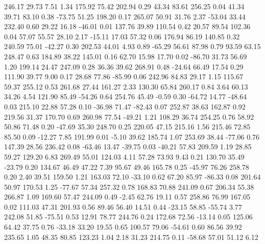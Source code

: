   246.17   29.73    7.51    1.34
  175.92   75.42  202.94    0.29
   43.34   83.61  256.25    0.04
   41.34   39.71   83.10    0.38
  -73.75   51.25  198.20    0.17
  265.07   50.91   31.76    2.37
  -53.04   33.44  232.40    0.60
   29.22   16.18  -46.01    0.01
  137.76   39.89  110.54    0.42
   20.57   89.54  102.36    0.04
   57.07   55.57   28.10    2.17
  -15.11   17.03   57.32    0.06
  176.94   86.19  140.85    0.32
  240.59   75.01  -42.27    0.30
  202.53   44.01    4.93    0.89
  -65.29   56.61   87.98    0.79
   93.59   63.15  248.47    0.63
  184.89   38.22  145.01    0.16
   62.70   15.98   17.70    0.02
  -86.70   31.73   56.69    1.20
  199.14   24.47  247.09    0.28
   36.36   39.62  268.91    0.48
  -24.64   66.49   17.54    0.29
  111.90   39.77    9.00    0.17
   28.68   77.86  -85.99    0.06
  242.96   84.83   29.17    1.15
  115.67   59.37  255.12    0.53
  261.68   27.44  161.27    2.33
  130.30   65.84  260.17    0.84
    3.64   60.13   34.26    4.54
  121.90   85.49  -54.26    0.64
  254.76   45.49   -0.59    0.30
  -64.72   14.77  -48.64    0.03
  215.10   22.88   57.28    0.10
  -36.98   71.47  -82.43    0.07
  252.87   38.63  162.87    0.92
  219.56   31.37  170.70    0.69
  260.98   77.54  -49.21    1.21
  108.29   36.74  254.25    0.76
   58.92   50.86   71.48    0.20
  -47.69   35.30  248.70    0.25
  220.05   47.15  215.16    1.56
  215.46   72.85   85.50    0.09
  -12.27    7.85  191.99    0.01
   -5.10   39.62  185.74    1.07
  253.69   38.44  -77.06    0.76
  147.39   28.56  236.42    0.08
  -63.46   13.47  -39.75    0.03
  -40.21   57.83  209.59    1.19
   28.85   59.27  129.20    6.83
  269.49   55.01  124.03    4.11
   57.28   73.93    9.43    0.21
  130.70   35.49  -23.79    0.20
  134.67   46.49   47.22    7.39
   95.67   49.46  165.78    0.25
  -45.97   76.26  258.78    0.20
    2.40   39.51  159.50    1.21
  163.03   72.10  -33.10    0.62
   67.20   85.97  -86.33    0.08
  201.64   50.97  170.53    1.25
  -77.67   57.34  257.32    0.78
  168.83   70.88  241.09    0.67
  206.34   55.38  266.87    1.09
  169.60   57.47  244.09    0.49
   -2.45   62.76   19.11    0.57
  258.86   76.99  167.05    0.02
  111.03   47.31  201.93    0.56
   89.46   56.40   14.51    0.44
  -23.15   58.85  -55.74    3.77
  242.08   51.85  -75.51    0.53
   12.91   78.77  244.76    0.24
  172.68   72.56  -13.14    0.05
  125.06   64.42   37.75    0.76
  -33.18   33.20   19.55    0.65
  100.57   79.06  -54.61    0.60
   86.56   39.92  235.65    1.05
   48.35   80.85  123.23    1.04
    2.18   31.23  214.75    0.11
  -58.68   57.01   51.12    6.12
